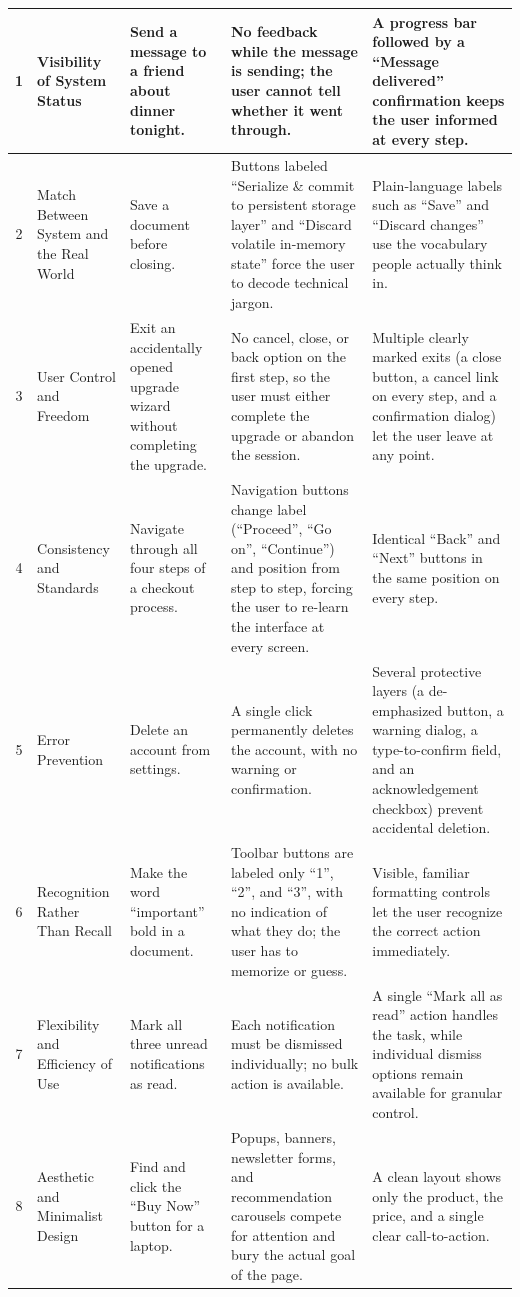 {\begin{longtable}[c]{c|p{2.3cm}|p{2.5cm}|p{4.0cm}|p{4.0cm}}
  1 & Visibility of System Status & Send a message to a friend about dinner tonight. & No feedback while the message is sending; the user cannot tell whether it went through. & A progress bar followed by a ``Message delivered'' confirmation keeps the user informed at every step. \\
  \hline
  2 & Match Between System and the Real World & Save a document before closing. & Buttons labeled ``Serialize \& commit to persistent storage layer'' and ``Discard volatile in-memory state'' force the user to decode technical jargon. & Plain-language labels such as ``Save'' and ``Discard changes'' use the vocabulary people actually think in. \\
  \hline
  3 & User Control and Freedom & Exit an accidentally opened upgrade wizard without completing the upgrade. & No cancel, close, or back option on the first step, so the user must either complete the upgrade or abandon the session. & Multiple clearly marked exits (a close button, a cancel link on every step, and a confirmation dialog) let the user leave at any point. \\
  \hline
  4 & Consistency and Standards & Navigate through all four steps of a checkout process. & Navigation buttons change label (``Proceed'', ``Go on'', ``Continue'') and position from step to step, forcing the user to re-learn the interface at every screen. & Identical ``Back'' and ``Next'' buttons in the same position on every step. \\
  \hline
  5 & Error Prevention & Delete an account from settings. & A single click permanently deletes the account, with no warning or confirmation. & Several protective layers (a de-emphasized button, a warning dialog, a type-to-confirm field, and an acknowledgement checkbox) prevent accidental deletion. \\
  \hline
  6 & Recognition Rather Than Recall & Make the word ``important'' bold in a document. & Toolbar buttons are labeled only ``1'', ``2'', and ``3'', with no indication of what they do; the user has to memorize or guess. & Visible, familiar formatting controls let the user recognize the correct action immediately. \\
  \hline
  7 & Flexibility and Efficiency of Use & Mark all three unread notifications as read. & Each notification must be dismissed individually; no bulk action is available. & A single ``Mark all as read'' action handles the task, while individual dismiss options remain available for granular control. \\
  \hline
  8 & Aesthetic and Minimalist Design & Find and click the ``Buy Now'' button for a laptop. & Popups, banners, newsletter forms, and recommendation carousels compete for attention and bury the actual goal of the page. & A clean layout shows only the product, the price, and a single clear call-to-action. \\

\end{longtable}}
